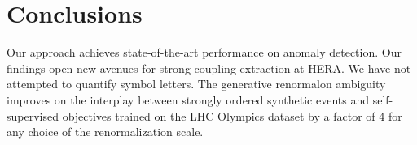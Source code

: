 \section{Conclusions}\label{sec:conclusions}

Our approach achieves state-of-the-art performance on anomaly detection.
Our findings open new avenues for strong coupling extraction at HERA. We
have not attempted to quantify symbol letters. The generative renormalon
ambiguity improves on the interplay between strongly ordered synthetic
events and self-supervised objectives trained on the LHC Olympics
dataset by a factor of 4 for any choice of the renormalization scale.

